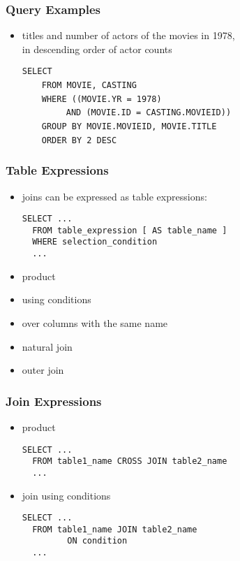 \documentclass[dvipsnames]{beamer}
\theoremstyle{plain}
\begin{document}
\begin{frame}[fragile]
  \frametitle{Query Examples}

  \begin{itemize}
    \item titles and number of actors of the movies in 1978,\\
      in descending order of actor counts

    \medskip
\lstinline!SELECT! \\
~~~~\lstinline!FROM MOVIE, CASTING!\\
\pause
~~~~\lstinline!WHERE ((MOVIE.YR = 1978)!\\
~~~~~~~~~\lstinline!AND (MOVIE.ID = CASTING.MOVIEID))!\\
\pause
~~~~\lstinline!GROUP BY MOVIE.MOVIEID, MOVIE.TITLE!\\
\pause\pause
~~~~\lstinline!ORDER BY 2 DESC!
  \end{itemize}
\end{frame}

\begin{frame}[fragile]
  \frametitle{Table Expressions}

  \begin{itemize}
    \item joins can be expressed as table expressions:
    \begin{lstlisting}
SELECT ...
  FROM table_expression [ AS table_name ]
  WHERE selection_condition
  ...
    \end{lstlisting}

    \medskip
    \item product
    \item using conditions
    \item over columns with the same name
    \item natural join
    \item outer join
  \end{itemize}
\end{frame}

\begin{frame}[fragile]
  \frametitle{Join Expressions}

  \begin{itemize}
    \item product
    \begin{lstlisting}
SELECT ...
  FROM table1_name CROSS JOIN table2_name
  ...
    \end{lstlisting}

    \pause
    \medskip
    \item join using conditions
    \begin{lstlisting}
SELECT ...
  FROM table1_name JOIN table2_name
         ON condition
  ...
    \end{lstlisting}
  \end{itemize}
\end{frame}
\end{document}
